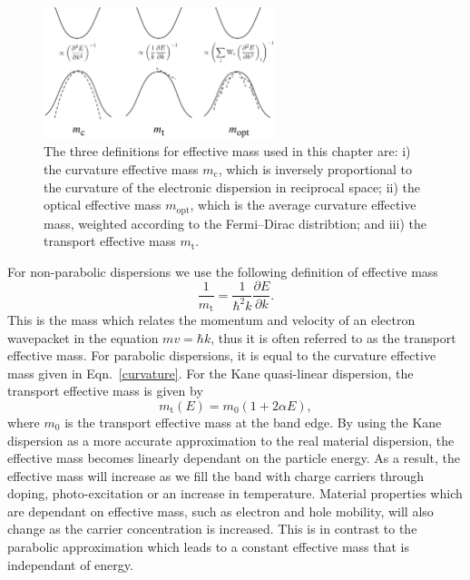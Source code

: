 \begin{figure}[tb] \centering
\includegraphics[width=0.6\textwidth]{./figures/ch4/effmass_schematic.pdf}
\caption[Schematic of the three definitions for effective mass]{\label{effmass_schematic} The three definitions for effective mass used in this chapter are: i) the curvature effective mass $m_{\text{c}}$, which is inversely proportional to the curvature of the electronic dispersion in reciprocal space; ii) the optical effective mass $m_{\text{opt}}$, which is the average curvature effective mass, weighted according to the Fermi--Dirac distribtion; and iii) the transport effective mass $m_{\text{t}}$. }
\end{figure}

For non-parabolic dispersions we use the following definition of effective mass
\begin{equation} \label{transport}
\frac{1}{m_\text{t}} = \frac{1}{\hbar^2 k}\frac{\partial E}{\partial k}.
\end{equation}
This is the mass which relates the momentum and velocity of an electron wavepacket in the equation $mv = \hbar k$,\autocite{Ariel2012} thus it is often referred to as the transport effective mass.
For parabolic dispersions, it is equal to the curvature effective mass given in Eqn.\ \ref{curvature}. 
For the Kane quasi-linear dispersion, the transport effective mass is given by
\begin{equation} \label{kanemass}
m_\text{t}(E) = m_0(1+2 \alpha E),
\end{equation}
where $m_{0}$ is the transport effective mass at the band edge.\autocite{Segev2005} 
By using the Kane dispersion as a more accurate approximation to the real material dispersion, the effective mass becomes linearly dependant on the particle energy.
As a result, the effective mass will increase as we fill the band with charge carriers through doping, photo-excitation or an increase in temperature.\autocite{Riffe2002}
Material properties which are dependant on effective mass, such as electron and hole mobility, will also change as the carrier concentration is increased.
This is in contrast to the parabolic approximation which leads to a constant effective mass that is independant of energy.

